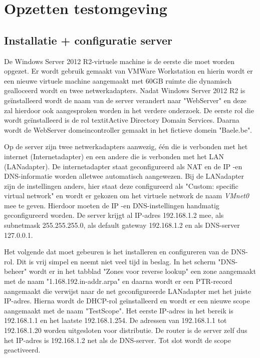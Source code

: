 \documentclass[pdftex,a4paper,12pt]{report}
\begin{document}
\section{Opzetten testomgeving}
\subsection{Installatie + configuratie server}
De Windows Server 2012 R2-virtuele machine is de eerste die moet worden opgezet. Er wordt gebruik gemaakt van VMWare Workstation en hierin wordt er een nieuwe virtuele machine aangemaakt met 60GB ruimte die dynamisch gealloceerd wordt en twee netwerkadapters. Nadat Windows Server 2012 R2 is geïnstalleerd wordt de naam van de server verandert naar "WebServer" en deze zal hierdoor ook aangesproken worden in het verdere onderzoek. De eerste rol die wordt geïnstalleerd is de rol textit{Active Directory Domain Services}. Daarna wordt de WebServer domeincontroller gemaakt in het fictieve domein "Baele.be". \newline \newline 

Op de server zijn twee netwerkadapters aanwezig, één die is verbonden met het internet (Internetadapter) en een andere die is verbonden met het LAN (LANadapter). De internetadapter staat geconfigureerd als NAT en de IP -en DNS-informatie worden alletwee automatisch aangewezen. Bij de LANadapter zijn de instellingen anders, hier staat deze configureerd als "Custom: specific virtual network" en wordt er gekozen om het virtuele network de naam \textit{VMnet0} mee te geven. Hierdoor moeten de IP -en DNS-instellingen handmatig geconfigureerd worden. De server krijgt al IP-adres 192.168.1.2 mee, als subnetmask 255.255.255.0, als default gateway 192.168.1.2 en als DNS-server 127.0.0.1. \newline \newline

Het volgende dat moet gebeuren is het installeren en configureren van de DNS-rol. Dit is vrij simpel en neemt niet veel tijd in beslag. In het scherm "DNS-beheer" wordt er in het tabblad "Zones voor reverse lookup" een zone aangemaakt met de naam "1.168.192.in-addr.arpa" en daarna wordt er een PTR-record aangemaakt die verwijst naar de net geconfigureerde LANadapter met het juiste IP-adres. Hierna wordt de DHCP-rol geïnstalleerd en wordt er een nieuwe scope aangemaakt met de naam "TestScope". Het eerste IP-adres in het bereik is 192.168.1.1 en het laatste 192.168.1.254. De adressen van 192.168.1.1 tot 192.168.1.20 worden uitgesloten voor distributie. De router is de server zelf dus het IP-adres is 192.168.1.2 net als de DNS-server. Tot slot wordt de scope geactiveerd. \newline \newline
\end{document}
